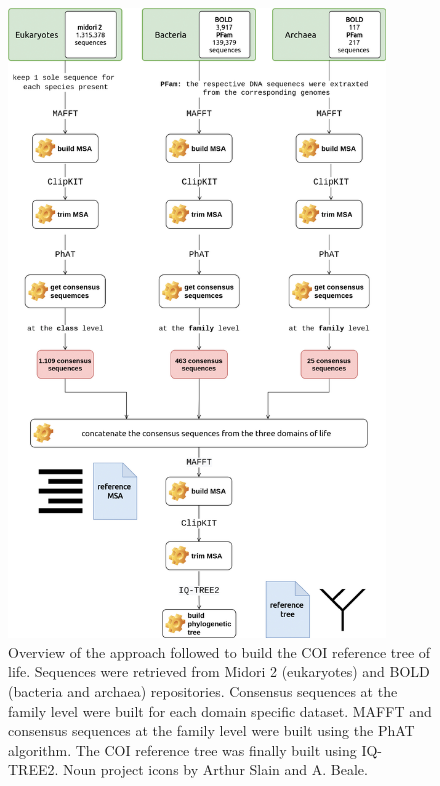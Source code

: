    \begin{figure}
      \centering
      \includegraphics[width=100mm]{figures/darn_methodology.jpg}
      \caption[Building the COI reference tree of life]{
         Overview of the approach followed to build the COI reference tree of life. 
         Sequences were retrieved from Midori 2 (eukaryotes) and BOLD (bacteria and archaea) repositories. 
         Consensus sequences at the family level were built for each domain specific dataset. 
         MAFFT and consensus sequences at the family level were built using the PhAT algorithm. 
         The COI reference tree was finally built using IQ-TREE2. 
         Noun project icons by Arthur Slain and A. Beale.
      }
      \label{fig:darn-build-tree}
   \end{figure}


